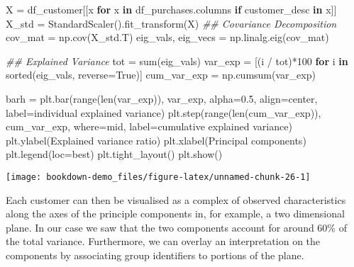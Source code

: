 \documentclass[]{tufte-book}
\newenvironment{Shaded}{}{}
\newcommand{\BuiltInTok}[1]{#1}
\newcommand{\CommentTok}[1]{\textcolor[rgb]{0.38,0.63,0.69}{\textit{#1}}}
\newcommand{\ControlFlowTok}[1]{\textcolor[rgb]{0.00,0.44,0.13}{\textbf{#1}}}
\newcommand{\DecValTok}[1]{\textcolor[rgb]{0.25,0.63,0.44}{#1}}
\newcommand{\FloatTok}[1]{\textcolor[rgb]{0.25,0.63,0.44}{#1}}
\newcommand{\KeywordTok}[1]{\textcolor[rgb]{0.00,0.44,0.13}{\textbf{#1}}}
\newcommand{\NormalTok}[1]{#1}
\newcommand{\OperatorTok}[1]{\textcolor[rgb]{0.40,0.40,0.40}{#1}}
\newcommand{\StringTok}[1]{\textcolor[rgb]{0.25,0.44,0.63}{#1}}
\newcommand{\VariableTok}[1]{\textcolor[rgb]{0.10,0.09,0.49}{#1}}
\theoremstyle{definition}
\theoremstyle{definition}
\theoremstyle{definition}
\theoremstyle{remark}
\begin{document}
\begin{Shaded}
\begin{Highlighting}[]
\NormalTok{X }\OperatorTok{=}\NormalTok{ df\_customer[[x }\ControlFlowTok{for}\NormalTok{ x }\KeywordTok{in}\NormalTok{ df\_purchases.columns }
\ControlFlowTok{if} \StringTok{\textquotesingle{}customer\_desc\textquotesingle{}} \KeywordTok{in}\NormalTok{ x]]}
\NormalTok{X\_std }\OperatorTok{=}\NormalTok{ StandardScaler().fit\_transform(X)}
\CommentTok{\#\# Covariance Decomposition}
\NormalTok{cov\_mat }\OperatorTok{=}\NormalTok{ np.cov(X\_std.T)}
\NormalTok{eig\_vals, eig\_vecs }\OperatorTok{=}\NormalTok{ np.linalg.eig(cov\_mat)}

\CommentTok{\#\# Explained Variance}
\NormalTok{tot }\OperatorTok{=} \BuiltInTok{sum}\NormalTok{(eig\_vals)}
\NormalTok{var\_exp }\OperatorTok{=}\NormalTok{ [(i }\OperatorTok{/}\NormalTok{ tot)}\OperatorTok{*}\DecValTok{100} \ControlFlowTok{for}\NormalTok{ i }\KeywordTok{in} \BuiltInTok{sorted}\NormalTok{(eig\_vals, reverse}\OperatorTok{=}\VariableTok{True}\NormalTok{)]}
\NormalTok{cum\_var\_exp }\OperatorTok{=}\NormalTok{ np.cumsum(var\_exp)}

\NormalTok{barh }\OperatorTok{=}\NormalTok{ plt.bar(}\BuiltInTok{range}\NormalTok{(}\BuiltInTok{len}\NormalTok{(var\_exp)), var\_exp, alpha}\OperatorTok{=}\FloatTok{0.5}\NormalTok{, align}\OperatorTok{=}\StringTok{\textquotesingle{}center\textquotesingle{}}\NormalTok{,}
\NormalTok{        label}\OperatorTok{=}\StringTok{\textquotesingle{}individual explained variance\textquotesingle{}}\NormalTok{)}
\NormalTok{plt.step(}\BuiltInTok{range}\NormalTok{(}\BuiltInTok{len}\NormalTok{(cum\_var\_exp)), cum\_var\_exp, where}\OperatorTok{=}\StringTok{\textquotesingle{}mid\textquotesingle{}}\NormalTok{,}
\NormalTok{         label}\OperatorTok{=}\StringTok{\textquotesingle{}cumulative explained variance\textquotesingle{}}\NormalTok{)}
\NormalTok{plt.ylabel(}\StringTok{\textquotesingle{}Explained variance ratio\textquotesingle{}}\NormalTok{)}
\NormalTok{plt.xlabel(}\StringTok{\textquotesingle{}Principal components\textquotesingle{}}\NormalTok{)}
\NormalTok{plt.legend(loc}\OperatorTok{=}\StringTok{\textquotesingle{}best\textquotesingle{}}\NormalTok{)}
\NormalTok{plt.tight\_layout()}
\NormalTok{plt.show()}
\end{Highlighting}
\end{Shaded}

\texttt{[image: bookdown-demo\_files/figure-latex/unnamed-chunk-26-1]}

Each customer can then be visualised as a complex of observed characteristics along the axes of the principle components in, for example, a two dimensional plane. In our case we saw that the two components account for around 60\% of the total variance. Furthermore, we can overlay an interpretation on the components by associating group identifiers to portions of the plane.
\end{document}
